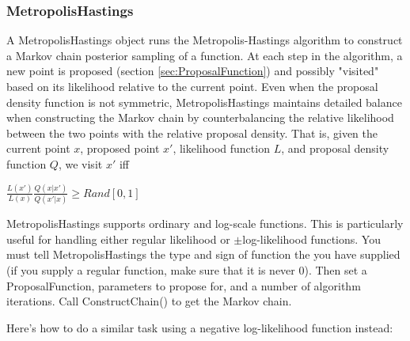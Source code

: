 \documentclass[11pt]{article}
\begin{document}
	\subsubsection{MetropolisHastings}
	\label{sec:MetropolisHastings}
	A MetropolisHastings object runs the Metropolis-Hastings algorithm to construct a Markov chain posterior sampling of a function.  At each step in the algorithm, a new point is proposed (section \ref{sec:ProposalFunction}) and possibly "visited" based on its likelihood relative to the current point.  Even when the proposal density function is not symmetric, MetropolisHastings maintains detailed balance when constructing the Markov chain by counterbalancing the relative likelihood between the two points with the relative proposal density.  That is, given the current point $x$, proposed point $x'$, likelihood function $L$, and proposal density function $Q$, we visit $x'$ iff
	\begin{center}
	$\displaystyle \frac{L(x')}{L(x)} \frac{Q(x | x')}{Q(x' | x)} \geq Rand[0,1]$
	\end{center}
	MetropolisHastings supports ordinary and log-scale functions.  This is particularly useful for handling either regular likelihood or $\pm$log-likelihood functions.  You must tell MetropolisHastings the type and sign of function the you have supplied (if you supply a regular function, make sure that it is never 0).  Then set a ProposalFunction, parameters to propose for, and a number of algorithm iterations.  Call ConstructChain() to get the Markov chain.
	
	
	
	Here's how to do a similar task using a negative log-likelihood function instead:
	
	
	
\end{document}
